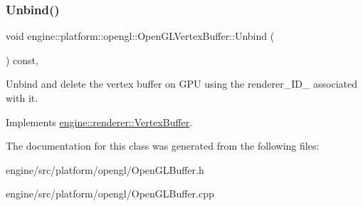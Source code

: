 \subsubsection{\texorpdfstring{Unbind()}{Unbind()}}
{\footnotesize\ttfamily void engine\+::platform\+::opengl\+::\+Open\+G\+L\+Vertex\+Buffer\+::\+Unbind (\begin{DoxyParamCaption}{ }\end{DoxyParamCaption}) const\hspace{0.3cm}{\ttfamily [override]}, {\ttfamily [virtual]}}

Unbind and delete the vertex buffer on G\+PU using the renderer\+\_\+\+I\+D\+\_\+ associated with it. 

Implements \hyperlink{classengine_1_1renderer_1_1VertexBuffer_a06b240b93506dfd383b3a3f8947eb26f}{engine\+::renderer\+::\+Vertex\+Buffer}.



The documentation for this class was generated from the following files\+:\begin{DoxyCompactItemize}
\item 
engine/src/platform/opengl/Open\+G\+L\+Buffer.\+h\item 
engine/src/platform/opengl/Open\+G\+L\+Buffer.\+cpp\end{DoxyCompactItemize}
